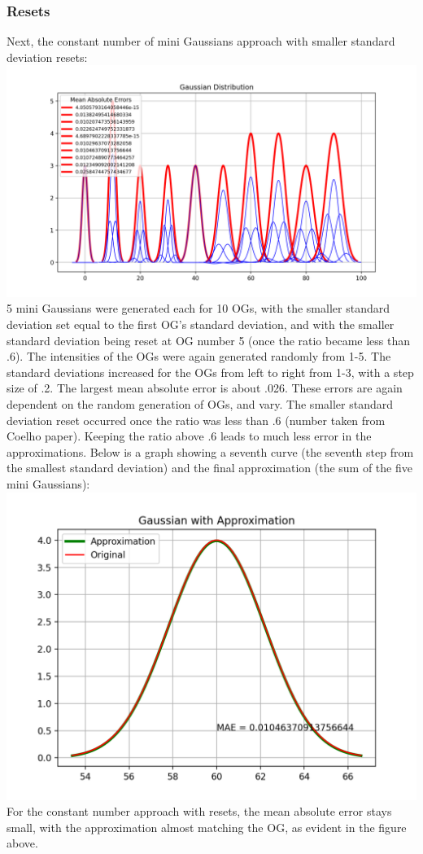 \documentclass{article}
\begin{document}
\subsubsection*{Resets}
Next, the constant number of mini Gaussians approach with smaller standard deviation resets: \\
\includegraphics[scale = .8,trim= 2in 0.1in 2in 0in]{resets.png} \\
5 mini Gaussians were generated each for 10 OGs, with the smaller standard deviation set equal to the first OG's standard deviation, and with the smaller standard deviation being reset at OG number 5 (once the ratio became less than .6). The intensities of the OGs were again generated randomly from 1-5. The standard deviations increased for the OGs from left to right from 1-3, with a step size of .2. The largest mean absolute error is about .026. These errors are again dependent on the random generation of OGs, and vary. The smaller standard deviation reset occurred once the ratio was less than .6 (number taken from Coelho paper). Keeping the ratio above .6 leads to much less error in the approximations. Below is a graph showing a seventh curve (the seventh step from the smallest standard deviation) and the final approximation (the sum of the five mini Gaussians): \\
\includegraphics[scale = .8]{resets_single.png} \\
For the constant number approach with resets, the mean absolute error stays small, with the approximation almost matching the OG, as evident in the figure above. \\
\newpage
\end{document}

